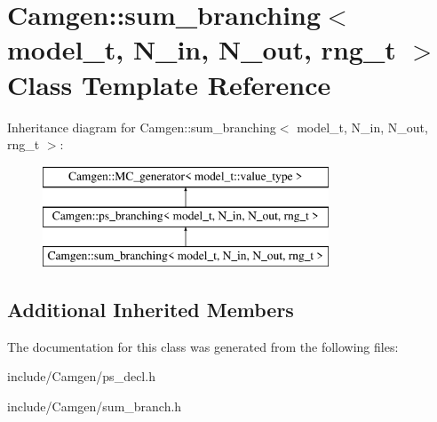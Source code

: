 \hypertarget{a00513}{\section{Camgen\-:\-:sum\-\_\-branching$<$ model\-\_\-t, N\-\_\-in, N\-\_\-out, rng\-\_\-t $>$ Class Template Reference}
\label{a00513}
}
Inheritance diagram for Camgen\-:\-:sum\-\_\-branching$<$ model\-\_\-t, N\-\_\-in, N\-\_\-out, rng\-\_\-t $>$\-:\begin{figure}[H]
\begin{center}
\leavevmode
\includegraphics[height=3.000000cm]{a00513}
\end{center}
\end{figure}
\subsection*{Additional Inherited Members}


The documentation for this class was generated from the following files\-:\begin{DoxyCompactItemize}
\item 
include/\-Camgen/ps\-\_\-decl.\-h\item 
include/\-Camgen/sum\-\_\-branch.\-h\end{DoxyCompactItemize}
